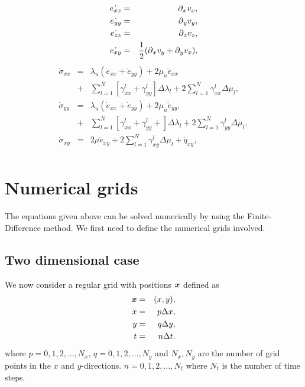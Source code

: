 \documentclass[11pt]{article}
\begin{document}
\begin{eqnarray}
    \dot{e_{xx}} & = & \mbox{$\partial$}_x v_x, \nonumber\\
    \dot{e_{yy}} & = & \mbox{$\partial$}_y v_y, \nonumber\\
    \dot{e_{zz}} & = & \mbox{$\partial$}_z v_z, \nonumber\\
    \dot{e_{xy}} & = & \frac{1}{2}(\mbox{$\partial$}_x v_y + \mbox{$\partial$}_y v_x),\nonumber\\
\end{eqnarray}
\begin{eqnarray}
  \dot{\sigma}_{xx} 
    & = & \lambda_u \left (\dot{e}_{xx} + \dot{e}_{yy} \right)
         + 2\mu_u \dot{e}_{xx}                                \nonumber\\
    & + & \sum_{l=1}^N\left[\gamma^l_{xx}
                           +\gamma^l_{yy}\right]\Delta\lambda_l
         + 2\sum_{l=1}^N\gamma^l_{xx}\Delta\mu_l,            \nonumber\\
  \dot{\sigma}_{yy} 
    & = & \lambda_u 
         \left (\dot{e}_{xx} + \dot{e}_{yy} \right)
         + 2\mu_u \dot{e}_{yy},                     \nonumber\\
    & + & \sum_{l=1}^N\left[\gamma^l_{xx}+\gamma^l_{yy} +
                             \right] \Delta\lambda_l  
         + 2\sum_{l=1}^N\gamma^l_{yy}\Delta\mu_l,                 \nonumber\\
  \dot{\sigma}_{xy} 
    & = & 2\mu \dot{e}_{xy} + 2\sum_{l=1}^N\gamma^l_{xy}
          \Delta\mu_l+\dot{q}_{xy}                                \nonumber,\\
\end{eqnarray} 

\section{Numerical grids}
The equations given above can be solved numerically by using the 
Finite-Difference method. 
We first need to define the numerical grids involved.

\subsection{Two dimensional case}

We now consider a regular grid with positions $\mbox{\boldmath $x$}$ 
defined as
\begin{eqnarray}
\mbox{\boldmath $x$} & = & (x,y),\\
x   & = & p\Delta x,\\
y   & = & q\Delta y,\\
t   & = & n\Delta t.
\end{eqnarray}
where $p=0,1,2,\ldots,N_x$, $q=0,1,2,\ldots,N_y$ and
$N_x,N_y$ are the number of grid points in the $x$ and 
$y$-directions.
$n=0,1,2,\ldots,N_t$ where $N_t$ is the number of time steps.
\end{document}
